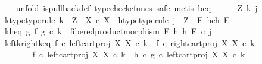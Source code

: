 \begin{isabellebody}
\ \ \isamarkupfalse%
\ {\isacharparenleft}{\kern0pt}unfold\ is{\isacharunderscore}{\kern0pt}pullback{\isacharunderscore}{\kern0pt}def{\isacharcomma}{\kern0pt}\ typecheck{\isacharunderscore}{\kern0pt}cfuncs{\isacharcomma}{\kern0pt}\ safe{\isacharcomma}{\kern0pt}\ metis\ b{\isacharunderscore}{\kern0pt}eq{\isacharparenright}{\kern0pt}\isanewline
\ \ \ \ \isamarkupfalse%
\ Z\ k\ j\isanewline
\ \ \ \ \isamarkupfalse%
\ k{\isacharunderscore}{\kern0pt}type{\isacharbrackleft}{\kern0pt}type{\isacharunderscore}{\kern0pt}rule{\isacharbrackright}{\kern0pt}{\isacharcolon}{\kern0pt}\ {\isachardoublequoteopen}k\ {\isacharcolon}{\kern0pt}\ Z\ {\isasymrightarrow}\ X\ {\isasymtimes}\isactrlsub c\ X{\isachardoublequoteclose}\ \ h{\isacharunderscore}{\kern0pt}type{\isacharbrackleft}{\kern0pt}type{\isacharunderscore}{\kern0pt}rule{\isacharbrackright}{\kern0pt}{\isacharcolon}{\kern0pt}\ {\isachardoublequoteopen}j\ {\isacharcolon}{\kern0pt}\ Z\ {\isasymrightarrow}\ E\ \isactrlbsub h\isactrlesub {\isasymtimes}\isactrlsub c\isactrlbsub h\isactrlesub \ E{\isachardoublequoteclose}\isanewline
\ \ \ \ \isamarkupfalse%
\ k{\isacharunderscore}{\kern0pt}h{\isacharunderscore}{\kern0pt}eq{\isacharcolon}{\kern0pt}\ {\isachardoublequoteopen}{\isacharparenleft}{\kern0pt}g\ {\isasymtimes}\isactrlsub f\ g{\isacharparenright}{\kern0pt}\ {\isasymcirc}\isactrlsub c\ k\ {\isacharequal}{\kern0pt}\ fibered{\isacharunderscore}{\kern0pt}product{\isacharunderscore}{\kern0pt}morphism\ E\ h\ h\ E\ {\isasymcirc}\isactrlsub c\ j{\isachardoublequoteclose}\isanewline
\isanewline
\ \ \ \ \isamarkupfalse%
\ left{\isacharunderscore}{\kern0pt}k{\isacharunderscore}{\kern0pt}right{\isacharunderscore}{\kern0pt}k{\isacharunderscore}{\kern0pt}eq{\isacharcolon}{\kern0pt}\ {\isachardoublequoteopen}f\ {\isasymcirc}\isactrlsub c\ left{\isacharunderscore}{\kern0pt}cart{\isacharunderscore}{\kern0pt}proj\ X\ X\ {\isasymcirc}\isactrlsub c\ k\ {\isacharequal}{\kern0pt}\ f\ {\isasymcirc}\isactrlsub c\ right{\isacharunderscore}{\kern0pt}cart{\isacharunderscore}{\kern0pt}proj\ X\ X\ {\isasymcirc}\isactrlsub c\ k{\isachardoublequoteclose}\isanewline
\ \ \ \ \isamarkupfalse%
\ {\isacharminus}{\kern0pt}\isanewline
\ \ \ \ \ \ \isamarkupfalse%
\ {\isachardoublequoteopen}f\ {\isasymcirc}\isactrlsub c\ left{\isacharunderscore}{\kern0pt}cart{\isacharunderscore}{\kern0pt}proj\ X\ X\ {\isasymcirc}\isactrlsub c\ k\ {\isacharequal}{\kern0pt}\ h\ {\isasymcirc}\isactrlsub c\ g\ {\isasymcirc}\isactrlsub c\ left{\isacharunderscore}{\kern0pt}cart{\isacharunderscore}{\kern0pt}proj\ X\ X\ {\isasymcirc}\isactrlsub c\ k{\isachardoublequoteclose}\isanewline

\end{isabellebody}
